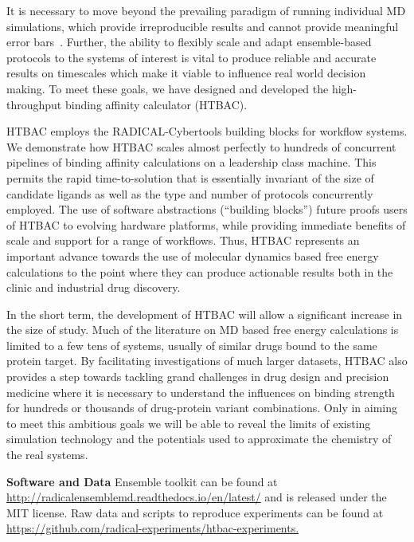 
It is necessary to move beyond the prevailing paradigm of running individual
MD simulations, which provide irreproducible results and cannot provide
meaningful error bars~\cite{Bhati2017}. Further, the ability to flexibly
scale and adapt ensemble-based protocols to the systems of interest is vital
to produce reliable and accurate results on timescales which make it viable
to influence real world decision making. To meet these goals, we have
designed and developed the high-throughput binding affinity calculator
(HTBAC).

HTBAC employs the RADICAL-Cybertools building blocks for workflow systems. We
demonstrate how HTBAC scales almost perfectly to hundreds of concurrent
pipelines of binding affinity calculations on a leadership class machine.
This permits the rapid time-to-solution that is essentially invariant of the
size of candidate ligands as well as the type and number of protocols
concurrently employed. The use of software abstractions (``building blocks'')
future proofs users of HTBAC to evolving hardware platforms, while providing
immediate benefits of scale and support for a range of workflows. Thus, HTBAC
represents an important advance towards the use of molecular dynamics based
free energy calculations to the point where they can produce actionable
results both in the clinic and industrial drug discovery.

In the short term, the development of HTBAC will allow a significant increase
in the size of study. Much of the literature on MD based free energy
calculations is limited to a few tens of systems, usually of similar drugs
bound to the same protein target. By facilitating investigations of much
larger datasets, HTBAC also provides a step towards tackling grand challenges
in drug design and precision medicine where it is necessary to understand the
influences on binding strength for hundreds or thousands of drug-protein
variant combinations. Only in aiming to meet this ambitious goals we will be
able to reveal the limits of existing simulation technology and the
potentials used to approximate the chemistry of the real systems.

\footnotesize \textbf{Software and Data} Ensemble toolkit can be found at
\url{http://radicalensemblemd.readthedocs.io/en/latest/} and is released
under the MIT license. Raw data and scripts to reproduce experiments can be
found at \url{https://github.com/radical-experiments/htbac-experiments.}
